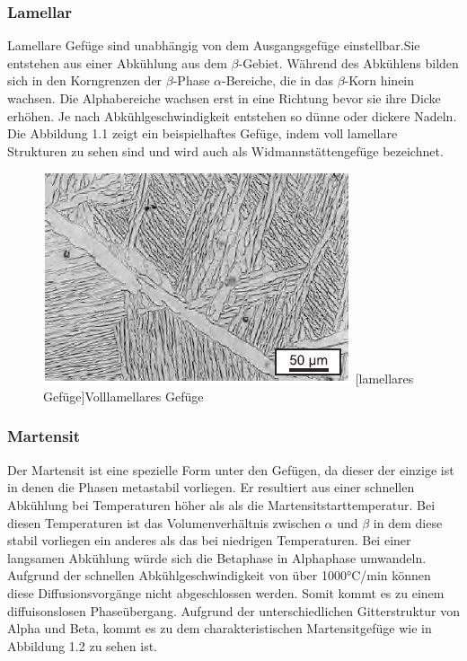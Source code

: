 \documentclass[a4paper, 11pt]{tubsreprt}
\begin{document}
\subsubsection{Lamellar}
Lamellare Gefüge sind unabhängig von dem Ausgangsgefüge einstellbar.Sie entstehen aus einer Abkühlung aus dem $\beta$-Gebiet. Während des Abkühlens bilden sich in den Korngrenzen der $\beta$-Phase $\alpha$-Bereiche, die in das $\beta$-Korn hinein wachsen. Die Alphabereiche wachsen erst in eine Richtung bevor sie ihre Dicke erhöhen. Je nach Abkühlgeschwindigkeit entstehen so dünne oder dickere Nadeln. Die Abbildung 1.1 zeigt ein beispielhaftes Gefüge, indem voll lamellare Strukturen zu sehen sind und wird auch als Widmannstättengefüge bezeichnet. 


\begin{figure}


	\centering
		\includegraphics[scale=1]{Bilder/lamellar.jpg}
		[lamellares Gefüge]{Volllamellares Gefüge \cite{Leyens2002}}
		\label{fig1}
		
\end{figure}
\subsubsection{Martensit}
Der Martensit ist eine spezielle Form unter den Gefügen, da dieser der einzige ist in denen die Phasen metastabil vorliegen. Er resultiert aus einer schnellen Abkühlung bei Temperaturen höher als als die Martensitstarttemperatur. Bei diesen Temperaturen ist das Volumenverhältnis zwischen $\alpha$ und $\beta$ in dem diese stabil vorliegen ein anderes als das bei niedrigen Temperaturen. Bei einer langsamen Abkühlung würde sich die Betaphase in Alphaphase umwandeln. Aufgrund der schnellen Abkühlgeschwindigkeit von über 1000°C/min können diese Diffusionsvorgänge nicht abgeschlossen werden. Somit kommt es zu einem diffuisonslosen Phaseübergang. Aufgrund der unterschiedlichen Gitterstruktur von Alpha und Beta, kommt es zu dem charakteristischen Martensitgefüge wie in Abbildung 1.2 zu sehen ist.
\end{document}
